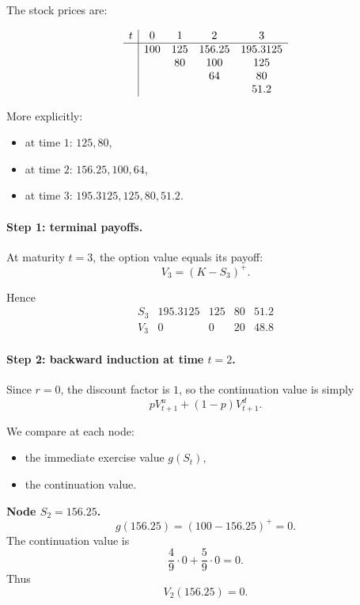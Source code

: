 \documentclass[11pt]{article}
\theoremstyle{definition}
\theoremstyle{plain}
\begin{document}
The stock prices are:

\[
\begin{array}{c|cccc}
t & 0 & 1 & 2 & 3 \\ \hline
& 100 & 125 & 156.25 & 195.3125 \\
&     & 80  & 100    & 125 \\
&     &     & 64     & 80 \\
&     &     &        & 51.2
\end{array}
\]

More explicitly:
\begin{itemize}[leftmargin=1.4em]
    \item at time \(1\): \(125,80\),
    \item at time \(2\): \(156.25,100,64\),
    \item at time \(3\): \(195.3125,125,80,51.2\).
\end{itemize}

\paragraph{Step 1: terminal payoffs.}

At maturity \(t=3\), the option value equals its payoff:
\[
V_3=(K-S_3)^+.
\]

Hence
\[
\begin{array}{c|cccc}
S_3 & 195.3125 & 125 & 80 & 51.2 \\ \hline
V_3 & 0 & 0 & 20 & 48.8
\end{array}
\]

\paragraph{Step 2: backward induction at time \(t=2\).}

Since \(r=0\), the discount factor is \(1\), so the continuation value is simply
\[
pV_{t+1}^u+(1-p)V_{t+1}^d.
\]

We compare at each node:
\begin{itemize}[leftmargin=1.4em]
    \item the immediate exercise value \(g(S_t)\),
    \item the continuation value.
\end{itemize}

\medskip

\noindent
\textbf{Node \(S_2=156.25\).}
\[
g(156.25)=(100-156.25)^+=0.
\]
The continuation value is
\[
\frac49\cdot 0+\frac59\cdot 0=0.
\]
Thus
\[
V_2(156.25)=0.
\]
\end{document}
